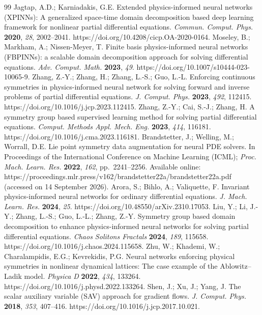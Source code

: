 \begin{thebibliography}{99}
 Jagtap, A.D.; Karniadakis, G.E. Extended physics-informed neural networks (XPINNs): A generalized space-time domain decomposition based deep learning framework for nonlinear partial differential equations. \textit{Commun. Comput. Phys.} \textbf{2020}, \textit{28}, 2002--2041. https://doi.org/10.4208/cicp.OA-2020-0164.
 Moseley, B.; Markham, A.; Nissen-Meyer, T. Finite basis physics-informed neural networks (FBPINNs): a scalable domain decomposition approach for solving differential equations. \textit{Adv. Comput. Math.} \textbf{2023}, \textit{49}. https://doi.org/10.1007/s10444-023-10065-9.
 Zhang, Z.-Y.; Zhang, H.; Zhang, L.-S.; Guo, L.-L. Enforcing continuous symmetries in physics-informed neural network for solving forward and inverse problems of partial differential equations. \textit{J. Comput. Phys.} \textbf{2023}, \textit{492}, 112415. https://doi.org/10.1016/j.jcp.2023.112415.
 Zhang, Z.-Y.; Cai, S.-J.; Zhang, H. A symmetry group based supervised learning method for solving partial differential equations. \textit{Comput. Methods Appl. Mech. Eng.} \textbf{2023}, \textit{414}, 116181. https://doi.org/10.1016/j.cma.2023.116181.
 Brandstetter, J.; Welling, M.; Worrall, D.E. Lie point symmetry data augmentation for neural PDE solvers. In Proceedings of the International Conference on Machine Learning (ICML); \textit{Proc. Mach. Learn. Res.} \textbf{2022}, \textit{162}, pp.\ 2241--2256. Available online: https://proceedings.mlr.press/v162/brandstetter22a/brandstetter22a.pdf (accessed on 14 September 2026).
 Arora, S.; Bihlo, A.; Valiquette, F. Invariant physics-informed neural networks for ordinary differential equations. \textit{J. Mach. Learn. Res.} \textbf{2024}, \textit{25}. https://doi.org/10.48550/arXiv.2310.17053.
 Liu, Y.; Li, J.-Y.; Zhang, L.-S.; Guo, L.-L.; Zhang, Z.-Y. Symmetry group based domain decomposition to enhance physics-informed neural networks for solving partial differential equations. \textit{Chaos Solitons Fractals} \textbf{2024}, \textit{189}, 115658. https://doi.org/10.1016/j.chaos.2024.115658.
 Zhu, W.; Khademi, W.; Charalampidis, E.G.; Kevrekidis, P.G. Neural networks enforcing physical symmetries in nonlinear dynamical lattices: The case example of the Ablowitz--Ladik model. \textit{Physica D} \textbf{2022}, \textit{434}, 133264. https://doi.org/10.1016/j.physd.2022.133264.
 Shen, J.; Xu, J.; Yang, J. The scalar auxiliary variable (SAV) approach for gradient flows. \textit{J. Comput. Phys.} \textbf{2018}, \textit{353}, 407--416. https://doi.org/10.1016/j.jcp.2017.10.021.

\end{thebibliography}
